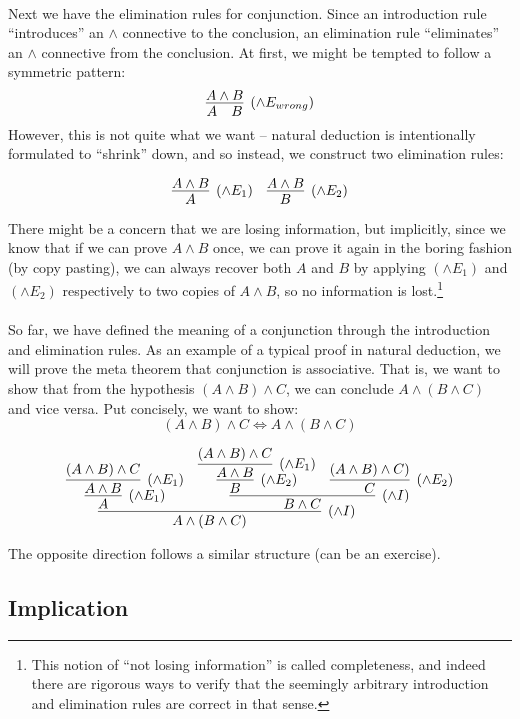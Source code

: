 \documentclass[a4paper]{article}
\begin{document}
\paragraph{}
Next we have the elimination rules for conjunction. Since an introduction rule
``introduces'' an $\land$ connective to the conclusion, an elimination rule
``eliminates'' an $\land$ connective from the conclusion. At first, we might be
tempted to follow a symmetric pattern:
$$\infer[(\land E_{wrong})]{A \quad B}{A \land B}$$
However, this is not quite what we want -- natural deduction is intentionally
formulated to ``shrink'' down, and so instead, we construct two elimination
rules:

\[
  \infer[(\land E_1)]{A}{A \land B} \quad
  \infer[(\land E_2)]{B}{A \land B}
\]

There might be a concern that we are losing information, but implicitly, since
we know that if we can prove $A \land B$ once, we can prove it again in the
boring fashion (by copy pasting), we can always recover both $A$ and $B$ by
applying $(\land E_1)$ and $(\land E_2)$ respectively to two copies of $A \land
B$, so no information is lost.\footnote{This notion of ``not losing information'' is
called completeness, and indeed there are rigorous ways to verify that the
seemingly arbitrary introduction and elimination rules are correct in that
sense.}

\paragraph{}
So far, we have defined the meaning of a conjunction through the introduction
and elimination rules. As an example of a typical proof in natural deduction, we
will prove the meta theorem that conjunction is associative. That is, we want to
show that from the hypothesis $(A \land B) \land C$, we can conclude $A \land (B
\land C)$ and vice versa. Put concisely, we want to show:
$$(A \land B) \land C \Leftrightarrow A \land (B \land C)$$

$$
\infer[(\land I)]{A \land (B \land C)}{
  \infer[(\land E_1)]{A}{
    \infer[(\land E_1)]{A \land B}{(A \land B) \land C}
  } &
  \infer[(\land I)]{B \land C}{
    \infer[(\land E_2)]{B}{
      \infer[(\land E_1)]{A \land B}{(A \land B) \land C}
  } &
    \infer[(\land E_2)]{C}{(A \land B) \land C)}
  }
}
$$

The opposite direction follows a similar structure (can be an exercise).

\subsection{Implication}
\end{document}
